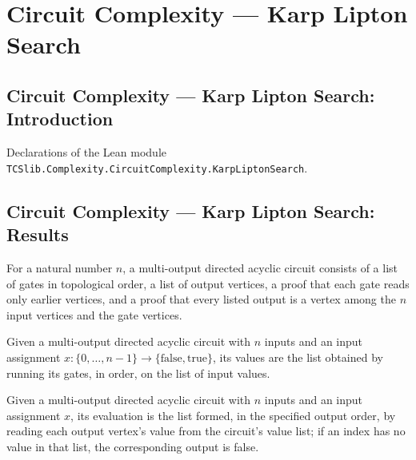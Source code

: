 \section{Circuit Complexity --- Karp Lipton Search}
\subsection*{Circuit Complexity --- Karp Lipton Search: Introduction}

Declarations of the Lean module \texttt{TCSlib.Complexity.CircuitComplexity.KarpLiptonSearch}.

\subsection*{Circuit Complexity --- Karp Lipton Search: Results}

\begin{definition}
\label{BoolCircuit.MultiDAGCircuit}
\leanok
{}
For a natural number $n$, a multi-output directed acyclic circuit consists of a list of
gates in topological order, a list of output vertices, a proof that each gate reads only
earlier vertices, and a proof that every listed output is a vertex among the $n$ input
vertices and the gate vertices.
\end{definition}

\begin{definition}
\label{BoolCircuit.MultiDAGCircuit.values}
\leanok
{}
Given a multi-output directed acyclic circuit with $n$ inputs and an input assignment
$x:\{0,\ldots,n-1\}\to\{\mathrm{false},\mathrm{true}\}$, its values are the list
obtained by running its gates, in order, on the list of input values.
\end{definition}

\begin{definition}
\label{BoolCircuit.MultiDAGCircuit.eval}
\leanok
{}
Given a multi-output directed acyclic circuit with $n$ inputs and an input assignment
$x$, its evaluation is the list formed, in the specified output order, by reading each
output vertex's value from the circuit's value list; if an index has no value in that
list, the corresponding output is false.
\end{definition}

